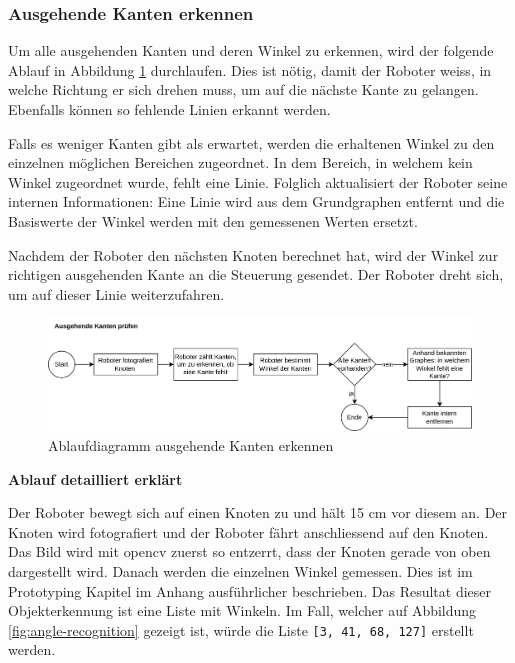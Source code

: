 \subsubsection{Ausgehende Kanten erkennen}\label{outgoing-angles}

Um alle ausgehenden Kanten und deren Winkel zu erkennen, wird der folgende Ablauf in Abbildung \ref{fig:ablaufdiagramm-kanten-erkennen} durchlaufen. Dies ist nötig, damit der Roboter weiss, in welche Richtung er sich drehen muss, um auf die nächste Kante zu gelangen. Ebenfalls können so fehlende Linien erkannt werden.

Falls es weniger Kanten gibt als erwartet, werden die erhaltenen Winkel zu den einzelnen möglichen Bereichen zugeordnet. In dem Bereich, in welchem kein Winkel zugeordnet wurde, fehlt eine Linie. Folglich aktualisiert der Roboter seine internen Informationen: Eine Linie wird aus dem Grundgraphen entfernt und die Basiswerte der Winkel werden mit den gemessenen Werten ersetzt.

Nachdem der Roboter den nächsten Knoten berechnet hat, wird der Winkel zur richtigen ausgehenden Kante an die Steuerung gesendet. Der Roboter dreht sich, um auf dieser Linie weiterzufahren.

\begin{figure}[H]
\centering
\includegraphics[width=\textwidth]{assets/gesamtkonzept/ablaufdiagramm-kanten-erkennen.png}
\caption{Ablaufdiagramm ausgehende Kanten erkennen}
\label{fig:ablaufdiagramm-kanten-erkennen}
\end{figure}

\textbf{Ablauf detailliert erklärt}

Der Roboter bewegt sich auf einen Knoten zu und hält 15 cm vor diesem an. Der Knoten wird fotografiert und der Roboter fährt anschliessend auf den Knoten. Das Bild wird mit \gls{opencv} zuerst so entzerrt, dass der Knoten gerade von oben dargestellt wird. Danach werden die einzelnen Winkel gemessen. Dies ist im Prototyping Kapitel im Anhang  ausführlicher beschrieben. Das Resultat dieser Objekterkennung ist eine Liste mit Winkeln. Im Fall, welcher auf Abbildung \ref{fig:angle-recognition} gezeigt ist, würde die Liste \verb|[3, 41, 68, 127]| erstellt werden.

